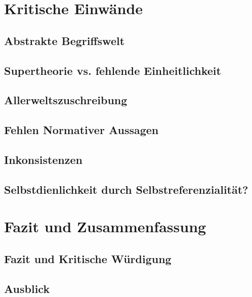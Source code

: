 \documentclass[a4paper,12pt]{article}
\begin{document}
\section{Kritische Einwände}
\subsection{Abstrakte Begriffswelt}
\subsection{Supertheorie vs. fehlende Einheitlichkeit}
\subsection{Allerweltszuschreibung}
\subsection{Fehlen Normativer Aussagen}
\subsection{Inkonsistenzen}
\subsection{Selbstdienlichkeit durch Selbstreferenzialität?}
\newpage

\section{Fazit und Zusammenfassung}
\subsection{Fazit und Kritische Würdigung}
\subsection{Ausblick}


\newpage




\printbibliography
% 
% 
\end{document}

